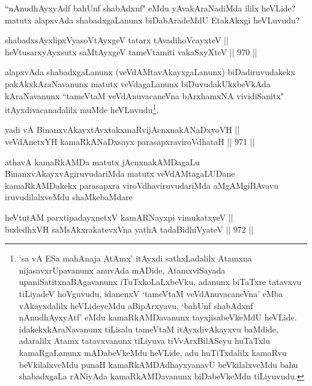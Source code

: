 \begin{artha}
``nAnudhAyxyAdf bahUnf shabAdxnf" eMdu yAvakAraNadiMda ililx heVLide? matutx alapxvAda shabadxgaLanunx biDabAradeMdU EtakAkxgi heVLuvudu?
\end{artha}


\begin{shl}
shabadxsAyxlipxVyasoV\s tAyxgeV tatarx tAvadihoVcayxteV || \\
heVtusarxyAyxsutx saMtAyxgeV tameVtamiti vakaSxyXteV \hfill || 970 ||  
\end{shl}

\begin{artha}
alapxvAda shabadxgaLanunx (veVdAMtavAkayxgaLanunx) biDadiruvudakekx pakAkxkAraNavanunx matutx veVdagaLanunx biDuvudakUkxbeVkAda kAraNavanunx ``tameVtaM veVdAnuvacaneVna bArxhamxNA vividiSanitx" itAyxdivacanadalilx muMde heVLuvudu\footnote{`sa vA ESa mahAnaja AtAmx' itAyxdi sathxLadalilx Atamxna nijasavxrUpavanunx anuvAda mADide, AtamxviSayada upaniSatitxnaBAgavanunx iTuTxkoLaLxbeVku, adanunx biTaTxre tatavxvu tiLiyadeV hoVguvudu, idanenxV `tameVtaM veVdAnuvacaneVna' eMba vAkayxdalilx heVLideyeMdu aBipArxyavu, `bahUnf shabAdxnf nAnudhAyxyAtf' eMdu kamaRkAMDavanunx tayxjisabeVkeMdU heVLide. idakekxkAraNavanunx tiLisalu tameVtaM itAyxdivAkayxvu baMdide, adaralilx Atamx tatavxvanunx tiLiyuva tiVvArxBilASeyu huTaTxlu kamaRgaLanunx mADabeVkeMdu heVLide, adu huTiTxdalilx kamaRvu beVkilalxveMdu punaH kamaRkAMDAdhayxyanavU beVkilalxveMdu bahu shabadxgaLa rANiyAda kamaRkAMDavanunx biDabeVkeMdu tiLiyuvudu.}.
\end{artha}


\begin{shl}
yadi vA BinanxvAkayxtAvxtakxmaRvijAcnxnakANaDxyoVH || \\
veVdAnetxYH kamaRkANaDxsayx parasapxraviroVdhataH \hfill || 971 ||  
\end{shl}

\begin{artha}
athavA kamaRkAMDa matutx jAcnxnakAMDagaLu BinanxvAkayxvAgiruvudariMda matutx veVdAMtagaLUDane kamaRkAMDakekx parasapxra viroVdhaviruvudariMda aMgAMgiBAvavu iruvudilalxveMdu shaMkebaMdare\ndash 
\end{artha}


\begin{shl}
heVtutAM parxtipadayxnetxV kamARNayxpi vimukatxyeV || \\
budedhxVH saMsAkxrakatevxVna yathA tadaBidhiVyateV \hfill || 972 ||  
\end{shl}


